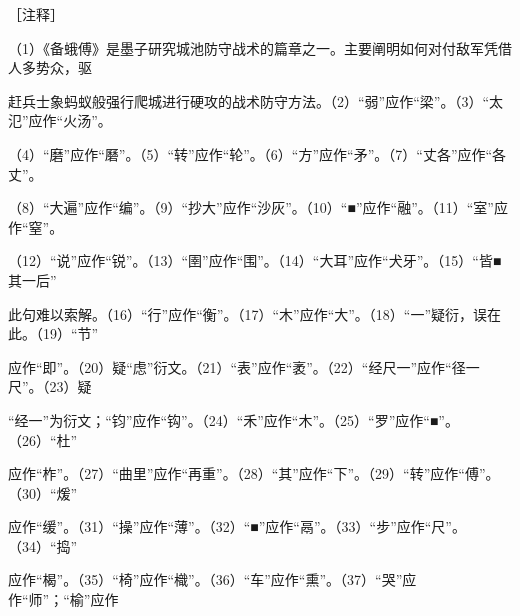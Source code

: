 \documentclass[12pt,UTF8]{ctexbook}
\begin{document}
［注释］ 

（1）《备蛾傅》是墨子研究城池防守战术的篇章之一。主要阐明如何对付敌军凭借人多势众，驱 

赶兵士象蚂蚁般强行爬城进行硬攻的战术防守方法。（2）“弱”应作“梁”。（3）“太氾”应作“火汤”。 

（4）“磨”应作“磿”。（5）“转”应作“轮”。（6）“方”应作“矛”。（7）“丈各”应作“各丈”。 

（8）“大遍”应作“编”。（9）“抄大”应作“沙灰”。（10）“■”应作“融”。（11）“室”应作“窒”。 

（12）“说”应作“锐”。（13）“圉”应作“围”。（14）“大耳”应作“犬牙”。（15）“皆■其一后” 

此句难以索解。（16）“行”应作“衡”。（17）“木”应作“大”。（18）“一”疑衍，误在此。（19）“节” 

应作“即”。（20）疑“虑”衍文。（21）“表”应作“袤”。（22）“经尺一”应作“径一尺”。（23）疑 

“经一”为衍文；“钧”应作“钩”。（24）“禾”应作“木”。（25）“罗”应作“■”。（26）“杜” 

应作“柞”。（27）“曲里”应作“再重”。（28）“其”应作“下”。（29）“转”应作“傅”。（30）“煖” 

应作“缓”。（31）“操”应作“薄”。（32）“■”应作“鬲”。（33）“步”应作“尺”。（34）“捣” 

应作“楬”。（35）“椅”应作“樴”。（36）“车”应作“熏”。（37）“哭”应作“师”；“榆”应作 
\end{document}
